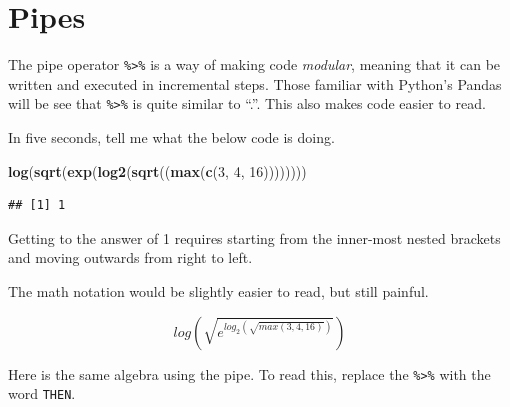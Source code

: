 \documentclass[
  openany]{book}
\newenvironment{Shaded}{\begin{snugshade}}{\end{snugshade}}
\newcommand{\DecValTok}[1]{\textcolor[rgb]{0.00,0.00,0.81}{#1}}
\newcommand{\KeywordTok}[1]{\textcolor[rgb]{0.13,0.29,0.53}{\textbf{#1}}}
\newcommand{\NormalTok}[1]{#1}
\newcommand{\OperatorTok}[1]{\textcolor[rgb]{0.81,0.36,0.00}{\textbf{#1}}}
\newcommand{\StringTok}[1]{\textcolor[rgb]{0.31,0.60,0.02}{#1}}
\begin{document}
\hypertarget{pipes}{%
\section{Pipes}\label{pipes}}

The pipe operator \texttt{\%\textgreater{}\%} is a way of making code \emph{modular}, meaning that it can
be written and executed in incremental steps. Those familiar with Python's Pandas
will be see that \texttt{\%\textgreater{}\%} is quite similar to ``.''. This also makes code easier to
read.

In five seconds, tell me what the below code is doing.

\begin{Shaded}
\begin{Highlighting}[]
\KeywordTok{log}\NormalTok{(}\KeywordTok{sqrt}\NormalTok{(}\KeywordTok{exp}\NormalTok{(}\KeywordTok{log2}\NormalTok{(}\KeywordTok{sqrt}\NormalTok{((}\KeywordTok{max}\NormalTok{(}\KeywordTok{c}\NormalTok{(}\DecValTok{3}\NormalTok{, }\DecValTok{4}\NormalTok{, }\DecValTok{16}\NormalTok{))))))))}
\end{Highlighting}
\end{Shaded}

\begin{verbatim}
## [1] 1
\end{verbatim}

Getting to the answer of 1 requires starting from the inner-most nested brackets
and moving outwards from right to left.

The math notation would be slightly easier to read, but still painful.

\[log(\sqrt{e^{log_2(\sqrt{max(3,4,16)})}})\]

Here is the same algebra using the pipe. To read this, replace the \texttt{\%\textgreater{}\%} with
the word \texttt{THEN}.

\begin{Shaded}
\end{Shaded}
\end{document}
